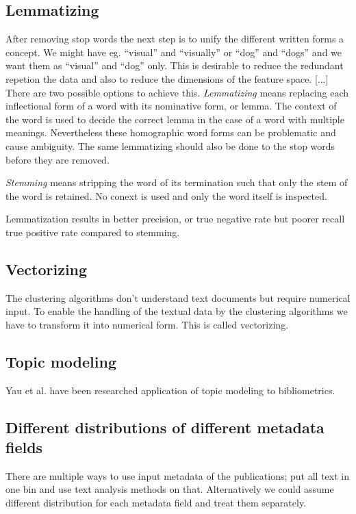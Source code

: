 \subsection{Lemmatizing}
After removing stop words the next step is to unify the 
different written forms a concept. We might have eg. ``visual'' 
and ``visually'' or ``dog'' and ``dogs'' and we want them as 
``visual'' and ``dog'' only. This is desirable to reduce the 
redundant repetion the data and also to reduce the dimensions of 
the feature space. [...] \cite{ref_here}
There are two possible options to achieve this. 
\emph{Lemmatizing} means replacing each inflectional form of a 
word with its nominative form, or lemma. The context of the word 
is used to decide the correct lemma in the case of a word with 
multiple meanings. Nevertheless these homographic word forms can 
be problematic and cause ambiguity. The same lemmatizing should 
also be done to the stop words before they are removed.

\emph{Stemming} means stripping the word of its termination such 
that only the stem of the word is retained. No conext is used and 
only the word itself is inspected.

Lemmatization results in better precision, or true negative rate 
but poorer recall true positive rate compared to stemming. 
\cite{ref_here}


\subsection{Vectorizing}
The clustering algorithms don't understand text documents but 
require numerical input. To enable the handling of the textual 
data by the clustering algorithms we have to transform it into 
numerical form. This is called vectorizing. 

\subsection{Topic modeling}
Yau et al. \cite{ref_here} have been researched application of 
topic modeling to bibliometrics.


\subsection{Different distributions of different metadata fields}
 There are multiple ways 
to use input metadata of the publications; put all text in one 
bin and use text analysis methods on that. Alternatively we could 
assume different distribution for each metadata field 
 and treat them separately.
